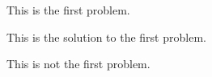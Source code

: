 \documentclass{homework}
\begin{document}
\problem This is the first problem.

\solution This is the solution to the first problem.

 This is not the first problem.
\end{document}
